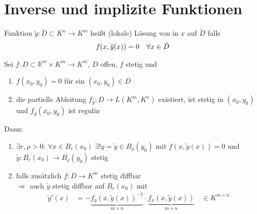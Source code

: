 \section{Inverse und implizite Funktionen}\setcounter{equation}{0}

\begin{*definition}
	Funktion $\tilde{y}:\tilde{D}\subset K^n\to K^m$ heißt (lokale) Lösung von in $x$ auf $\tilde{D}$ falls \begin{align}
		f(x,\tilde{y}(x)) = 0 \quad\forall x\in\tilde{D}\notag
	\end{align}
\end{*definition}

\begin{theorem}
	Sei $f:D\subset \mathbb{R}^m \times K^m\to K^m$, $D$ offen, $f$ stetig und \begin{enumerate}[label={\alph*)}]
		\item $f(x_0, y_0) = 0$ für ein $(x_0, y_0)\in D$
		\item die partielle Ableitung $f_y:D\to L(K^m, K^n)$ existiert, ist stetig in $(x_0, y_0)$ und $f_y(x_0, y_0)$ ist regulär
	\end{enumerate}
	Dann:\begin{enumerate}[label={\arabic*)}]
		\item $\exists r,\rho > 0$: $\forall x\in B_r(x_0)\;\exists! y=\tilde{y}\in B_\rho(y_0)$ mit $f(x,\tilde{y}(x)) = 0$ und $\tilde{y}:B_r(x_0)\to B_\rho(y_0)$ stetig
		\item
		falls zusätzlich $f:D\to K^m$ stetig diffbar\\
		$\Rightarrow$ auch $\tilde{y}$ stetig diffbar auf $B_r(x_0)$ mit \begin{align*}
			\tilde{y}'(x) &= -\underbrace{f_y(x,\tilde{y}(x))^{-1}}_{m\times n} \cdot \underbrace{f_x(x,\tilde{y}(x))}_{m\times n}\quad\in K^{m\times n}
		\end{align*}
	\end{enumerate}
\end{theorem}

